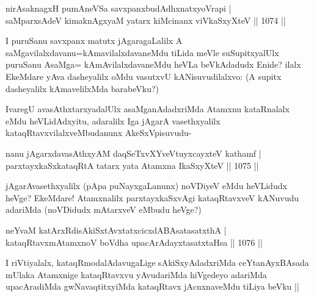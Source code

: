 \begin{shl}
nirAsaknagxH pumAneVSa savxpanxbudAdhxnatxyoVrapi | \\
saMparxsAdeV kimaknAgxyaM yatarx kiMcinanx viVkaSxyXteV \hfill||  1074 ||  
\end{shl}

\begin{artha}
I puruSanu savxpanx matutx jAgaragaLalilx A saMgavilalxdavanu=kAmavilalxdavaneMdu tiLida meVle suSupitxyalUlx puruSanu AsaMga= kAmAvilalxdavaneMdu heVLa beVkAdadudx Enide? ilalx EkeMdare yAva dasheyalilx oMdu vasutxvU kANisuvudilalxvo: (A supitx dasheyalilx kAmavelilxMda barabeVku?)
\end{artha}

\begin{artha}
IvaregU avasAthxtarxyadalUlx asaMganAdadxriMda Atamxnu kataRnalalx eMdu heVLidAdxyitu, adaralilx Iga jAgarA vasethxyalilx kataqRtavxvilalxveMbudanunx AkeSxVpisuvudu-
\end{artha}


\begin{shl}
nanu jAgarxdavasAthxyAM daqSeTxvXYveVtuyxcayxteV kathamf | \\
parxtayxkaSxkataqRtA tatarx yata Atamxna IkaSxyXteV \hfill||  1075 ||  
\end{shl}

\begin{artha}
jAgarAvasethxyalilx (pApa puNayxgaLanunx) noVDiyeV eMdu heVLidudx heVge? EkeMdare! Atamxnalilx parxtayxkaSxvAgi kataqRtavxveV kANuvudu adariMda (noVDidudx mAtarxveV eMbudu heVge?)
\end{artha}


\begin{shl}
neYvaM katArxRdisAkiSxtAvxtatxcicxdABAsatasatxthA | \\
kataqRtavxmAtamxnoV boVdha upacArAdayxtasatxtaHsa \hfill||  1076 ||  
\end{shl}

\begin{artha}
I riVtiyalalx, kataqRmodalAdavugaLige sAkiSxyAdadxriMda ceYtanAyxBAsada mUlaka Atamxnige kataqRtavxvu yAvudariMda hiVgedeyo adariMda upacAradiMda gwNavaqtitxyiMda kataqRtavx jAcnxnaveMdu tiLiya beVku ||
\end{artha}


